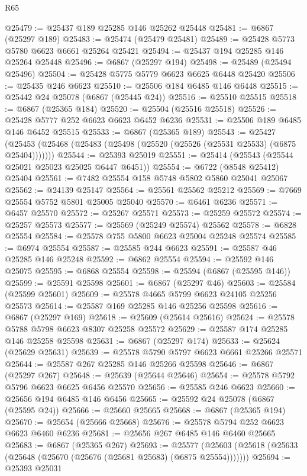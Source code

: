 \begin{lexlean}{R65}
\begin{coremodule}
{@25479 := @25437 @189 @25285 @146 @25262 @25448
@25481 := @6867 (@25297 @189)
@25483 := @25474 (@25479 @25481)
@25489 := @25428 @5773 @5780 @6623 @6661 @25264 @25421
@25494 := @25437 @194 @25285 @146 @25264 @25448
@25496 := @6867 (@25297 @194)
@25498 := @25489 (@25494 @25496)
@25504 := @25428 @5775 @5779 @6623 @6625 @6448 @25420
@25506 := @25435 @246 @6623
@25510 := @25506 @184 @6485 @146 @6448
@25515 := @25442 @24 @25078 (@6867 (@25445 @24))
@25516 := @25510 @25515
@25518 := @6867 (@25365 @184)
@25520 := @25504 (@25516 @25518)
@25526 := @25428 @5777 @252 @6623 @6623 @6452 @6236
@25531 := @25506 @189 @6485 @146 @6452 @25515
@25533 := @6867 (@25365 @189)
@25543 := @25427
    (@25453 (@25468 (@25483 (@25498 (@25520 (@25526 (@25531 @25533) (@6875 @25404)))))))
@25544 := @25393 @25019
@25551 := @25414 (@25543 (@25544 @25021 @25023 @25025 @6447 @6451))
@25554 := @6722 (@8548 @25412) @25404
@25561 := @7482 @25554 @158 @5748 @5802 @5860 @25041 @25067
@25562 := @24139 @25147
@25564 := @25561 @25562 @25212
@25569 := @7669 @25554 @5752 @5801 @25005 @25040
@25570 := @6461 @6236
@25571 := @6457 @25570
@25572 := @25267 @25571
@25573 := @25259 @25572
@25574 := @25257 @25573
@25577 := @25569 (@25249 @25574) @25562
@25578 := @6828 @25554
@25584 := @25578 @755 @5800 @6623 @25004 @25248 @25574
@25585 := @6974 @25554
@25587 := @25585 @244 @6623
@25591 := @25587 @46 @25285 @146 @25248
@25592 := @6862 @25554
@25594 := @25592 @146 @25075
@25595 := @6868 @25554
@25598 := @25594 (@6867 (@25595 @146))
@25599 := @25591 @25598
@25601 := @6867 (@25297 @46)
@25603 := @25584 (@25599 @25601)
@25609 := @25578 @4665 @5799 @6623 @24105 @25256 @25573
@25614 := @25587 @169 @25285 @146 @25256 @25598
@25616 := @6867 (@25297 @169)
@25618 := @25609 (@25614 @25616)
@25624 := @25578 @5788 @5798 @6623 @8307 @25258 @25572
@25629 := @25587 @174 @25285 @146 @25258 @25598
@25631 := @6867 (@25297 @174)
@25633 := @25624 (@25629 @25631)
@25639 := @25578 @5790 @5797 @6623 @6661 @25266 @25571
@25644 := @25587 @267 @25285 @146 @25266 @25598
@25646 := @6867 (@25297 @267)
@25648 := @25639 (@25644 @25646)
@25654 := @25578 @5792 @5796 @6623 @6625 @6456 @25570
@25656 := @25585 @246 @6623
@25660 := @25656 @194 @6485 @146 @6456
@25665 := @25592 @24 @25078 (@6867 (@25595 @24))
@25666 := @25660 @25665
@25668 := @6867 (@25365 @194)
@25670 := @25654 (@25666 @25668)
@25676 := @25578 @5794 @252 @6623 @6623 @6460 @6236
@25681 := @25656 @267 @6485 @146 @6460 @25665
@25683 := @6867 (@25365 @267)
@25693 := @25577
    (@25603 (@25618 (@25633 (@25648 (@25670 (@25676 (@25681 @25683) (@6875 @25554)))))))
@25694 := @25393 @25031
}
\end{coremodule}
\end{lexlean}
